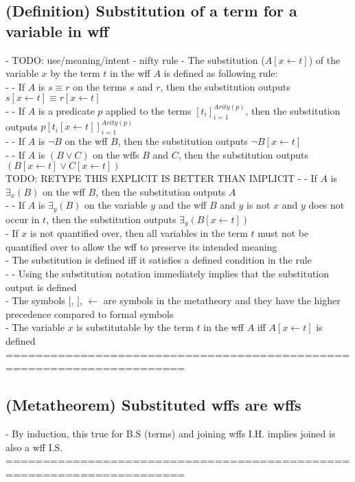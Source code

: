 \documentclass{article}
\begin{document}
\subsection{(Definition) Substitution of a term for a variable in wff}
	- TODO: use/meaning/intent - nifty rule
	- The substitution ($A[x \leftarrow t]$) of the variable $x$ by the term $t$ in the wff $A$ is defined as following rule: \\
		- - If $A$ is $s \equiv r$ on the terms $s$ and $r$, then the substitution outputs $s[x \leftarrow t] \equiv r[x \leftarrow t]$ \\
		- - If $A$ is a predicate $p$ applied to the terms $[t_i]_{i=1}^{Arity(p)}$, then the substitution outputs $p [t_i[x \leftarrow t]]_{i=1}^{Arity(p)}$ \\
		- - If $A$ is $\lnot B$ on the wff $B$, then the substitution outputs $\lnot B[x \leftarrow t]$ \\
		- - If $A$ is $(B \lor C)$ on the wffs $B$ and $C$, then the substitution outputs $(B[x \leftarrow t] \lor C[x \leftarrow t])$\\ TODO: RETYPE THIS EXPLICIT IS BETTER THAN IMPLICIT
		- - If $A$ is $\exists_x(B)$ on the wff $B$, then the substitution outputs $A$ \\
		- - If $A$ is $\exists_y(B)$ on the variable $y$ and the wff $B$ and $y$ is not $x$ and $y$ does not occur in $t$, then the substitution outputs $\exists_y(B[x \leftarrow t])$\\
	- If $x$ is not quantified over, then all variables in the term $t$ must not be quantified over to allow the wff to preserve its intended meaning \\
	- The substitution is defined iff it satisfies a defined condition in the rule \\
		- - Using the substitution notation immediately implies that the substitution output is defined \\
	- The symbols $[$, $]$, $\leftarrow$ are symbols in the metatheory and they have the higher precedence compared to formal symbols \\
	- The variable $x$ is substitutable by the term $t$ in the wff $A$ iff $A[x \leftarrow t]$ is defined 
	======================================================================
\subsection{(Metatheorem) Substituted wffs are wffs}
	- By induction, this true for B.S (terms) and joining wffs I.H. implies joined is also a wff I.S. \\
	======================================================================
\end{document}
